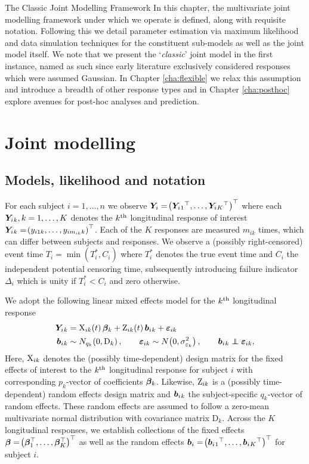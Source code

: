 \begin{chapter}{\label{cha:methods-classic}The Classic Joint Modelling Framework}
In this chapter, the multivariate joint modelling framework under which we operate is defined, along with requisite notation. Following this we detail parameter estimation via maximum likelihood and data simulation techniques for the constituent sub-models as well as the joint model itself. We note that we present the `\textit{classic}' joint model in the first instance, named as such since early literature exclusively considered responses which were assumed Gaussian. In Chapter \ref{cha:flexible} we relax this assumption and introduce a breadth of other response types and in Chapter \ref{cha:posthoc} explore avenues for post-hoc analyses and prediction.
  \section{\label{sec:methods-jm}Joint modelling}
  \subsection{\label{sec:methods-notation}Models, likelihood and notation}
  For each subject $i=1,\dots,n$ we observe $\bm{Y}_i=\!\left(\bm{Y}_i{_1}^\top,\dots,\bm{Y}_i{_K}^\top\right)^\top$ where each $\bm{Y}_i{_k}, k=1,\dots,K$ denotes the $k^{\text{th}}$ longitudinal response of interest $\bm{Y}_i{_k}=\!\left( y_{i1k},\dots,y_{im_{ik}k}\right)^\top$. Each of the $K$ responses are measured $m_{ik}$ times, which can differ between subjects and responses. We observe a (possibly right-censored) event time $T_i=\min(T_i^*,C_i)$ where $T_i^*$ denotes the true event time and $C_i$ the independent potential censoring time, subsequently introducing failure indicator $\Delta_i$ which is unity if $T_i^*<C_i$ and zero otherwise.
  
  We adopt the following linear mixed effects model for the $k^{\text{th}}$ longitudinal response
  \begin{equation}
    \begin{aligned}
      \Y{_k} &= \X_{ik}\lb t\rb\bb_{k} + \Z_{ik}\lb t\rb\b{_k} + \bm{\varepsilon}_{ik}\\
      \b{_k} &\sim N_{q_k}\lb 0, \mathrm{D}_k\rb, \qquad \bm{\varepsilon}_{ik}\sim N\lb0, \sigma^2_{\varepsilon_k}\rb,\qquad \b{_k}\indep\bm{\varepsilon}_{ik},
    \end{aligned}
  \label{eq:methods-lmm}
  \end{equation}
  Here, $\mathrm{X}_{ik}$ denotes the (possibly time-dependent) design matrix for the fixed effects of interest to the $k^{\text{th}}$ longitudinal response for subject $i$ with corresponding $p_k$-vector of coefficients $\bm{\beta}_k$. Likewise, $\mathrm{Z}_{ik}$ is a (possibly time-dependent) random effects design matrix and $\bm{b}_i{_k}$ the subject-specific $q_k$-vector of random effects. These random effects are assumed to follow a zero-mean multivariate normal distribution with covariance matrix $\mathrm{D}_k$. Across the $K$ longitudinal responses, we establish collections of the fixed effects $\bm{\beta}=\!\left(\bm{\beta}_1^\top,\dots,\bm{\beta}_K^\top\right)^\top$ as well as the random effects $\bm{b}_i=\!\left(\bm{b}_i{_1}^\top,\dots,\bm{b}_i{_K}^\top\right)^\top$ for subject $i$.
  

\end{chapter}
